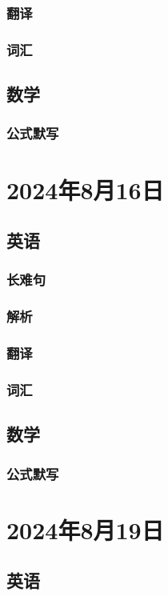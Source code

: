 \documentclass[UTF8]{ctexart}
\begin{document}
\subsubsection{翻译}
\subsubsection{词汇}
\subsection{数学}
\subsubsection{公式默写}
\begin{multicols}{2}
\end{multicols}
\section{2024年8月16日}
\subsection{英语}
\subsubsection{长难句}
\subsubsection{解析}
\subsubsection{翻译}
\subsubsection{词汇}
\subsection{数学}
\subsubsection{公式默写}
\begin{multicols}{2}
\end{multicols}
\section{2024年8月19日}
\subsection{英语}
\end{document}

